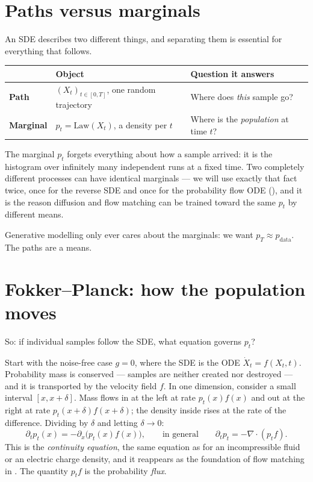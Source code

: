 \documentclass[11pt,a4paper]{report}
\theoremstyle{definition}
\theoremstyle{remark}
\begin{document}
\section{Paths versus marginals}
\label{sec:sde-paths-vs-marginals}

An SDE describes two different things, and separating them is essential for
everything that follows.

\begin{center}
\begin{tabular}{lll}
\toprule
& Object & Question it answers \\
\midrule
\textbf{Path} & $(X_t)_{t\in[0,T]}$, one random trajectory & Where does
\emph{this} sample go? \\
\textbf{Marginal} & $p_t = \mathrm{Law}(X_t)$, a density per $t$ & Where is
the \emph{population} at time $t$? \\
\bottomrule
\end{tabular}
\end{center}

The marginal $p_t$ forgets everything about how a sample arrived: it is the
histogram over infinitely many independent runs at a fixed time. Two
completely different processes can have identical marginals --- we will use
exactly that fact twice, once for the reverse SDE and once for the
probability flow ODE (), and it is the reason
diffusion and flow matching can be trained toward the same $p_t$ by
different means.

Generative modelling only ever cares about the marginals: we want
$p_T\approx p_{\mathrm{data}}$. The paths are a means.

\section{Fokker--Planck: how the population moves}
\label{sec:sde-fokker-planck}

So: if individual samples follow the SDE, what equation governs $p_t$?

Start with the noise-free case $g=0$, where the SDE is the ODE
$\dot X_t=f(X_t,t)$. Probability mass is conserved --- samples are neither
created nor destroyed --- and it is transported by the velocity field $f$.
In one dimension, consider a small interval $[x,x+\delta]$. Mass flows in at
the left at rate $p_t(x)f(x)$ and out at the right at rate
$p_t(x+\delta)f(x+\delta)$; the density inside rises at the rate of the
difference. Dividing by $\delta$ and letting $\delta\to0$:
\begin{equation}
\label{eq:continuity-1d}
\partial_tp_t(x) = -\partial_x\bigl(p_t(x)f(x)\bigr),
\qquad\text{in general}\qquad
\partial_tp_t = -\nabla\cdot(p_tf).
\end{equation}
This is the \emph{continuity equation}, the same equation as for an
incompressible fluid or an electric charge density, and it reappears as the
foundation of flow matching in . The quantity
$p_tf$ is the probability \emph{flux}.
\end{document}
